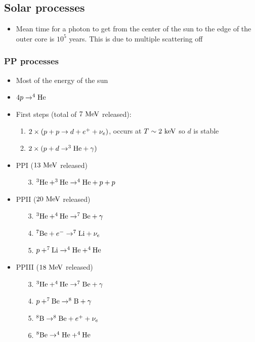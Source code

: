 \subsection{Solar processes}
\begin{itemize}
  \item Mean time for a photon to get from the center of the sun to the edge of the outer core is $10^5$ years. This is due to multiple scattering off \el
\end{itemize}
\subsubsection{PP processes}
\begin{itemize}
  \item Most of the energy of the sun
  \item $4p\rightarrow^{4}\text{He}$
  \item First steps (total of $7~\text{MeV}$ released):
  \begin{enumerate}
    \item $2\times(p+p\rightarrow d+e^{+}+\nu_e)$, occurs at $T\sim 2~\text{keV}$ so $d$ is stable
    \item $2\times(p+d\rightarrow^{3}\text{He}+\gamma)$
  \end{enumerate}
  \item PPI ($13~\text{MeV}$ released)
  \begin{enumerate}
    \item[3.] $^{3}\text{He}+^{3}\text{He}\rightarrow^{4}\text{He}+p+p$
  \end{enumerate}
  \item PPII ($20~\text{MeV}$ released)
  \begin{enumerate}
    \item[3.] $^{3}\text{He}+^{4}\text{He}\rightarrow^{7}\text{Be}+\gamma$
    \item[4.] $^{7}\text{Be}+e^{-}\rightarrow^{7}\text{Li}+\nu_e$
    \item[5.] $p+^{7}\text{Li}\rightarrow^{4}\text{He}+^{4}\text{He}$
  \end{enumerate}
  \item PPIII ($18~\text{MeV}$ released)
  \begin{enumerate}
    \item[3.] $^{3}\text{He}+^{4}\text{He}\rightarrow^{7}\text{Be}+\gamma$
    \item[4.] $p+^{7}\text{Be}\rightarrow^{8}\text{B}+\gamma$
    \item[5.] $^{8}\text{B} \rightarrow ^{8}\text{Be}+e^{+}+\nu_e$
    \item[6.] $^{8}\text{Be}\rightarrow ^{4}\text{He}+^{4}\text{He}$
  \end{enumerate}
\end{itemize}
